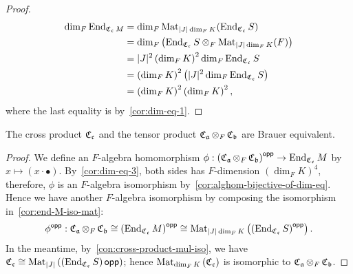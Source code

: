 \begin{proof}
  \[
    \begin{aligned}
      \dim_{F}\End_{\cross_{\mfc}M}
      &= \dim_{F}\mat_{|J|\dim_{F}K}(\End_{\cross_{\mfc}}S) \\
      &= \dim_{F}\left(\End_{\cross_{\mfc}}S\ox_{F}\mat_{|J|\dim_{F}K}(F)\right)\\
      &= |J|^{2}\left(\dim_{F}K\right)^{2}\dim_{F}\End_{\cross_{\mfc}}S\\
      &= \left(\dim_{F}K\right)^{2}\left(|J|^{2}\dim_{F}\End_{\cross_{\mfc}}S\right) \\
      &= \left(\dim_{F}K\right)^{2}\left(\dim_{F}K\right)^{2},
    \end{aligned}
  \]
  where the last equality is by~\cref{cor:dim-eq-1}.
\end{proof}

\begin{theorem}\label{thm:cross-mul}
  The cross product $\cross_{\mfc}$ and the tensor product $\cross_{\mfa}\ox_{F}\cross_{\mfb}$ are Brauer equivalent.
  \leanok
\end{theorem}

\begin{proof}
  We define an $F$-algebra homomorphism $\phi : \left(\cross_{\mfa}\ox_{F}\cross_{\mfb}\right)^{\opp} \to \End_{\cross_{\mfc}}M$ by
  $x \mapsto (x \cdot \bullet)$. By~\cref{cor:dim-eq-3}, both sides has $F$-dimension $\left(\dim_{F}K\right)^{4}$, therefore, $\phi$ is an $F$-algebra isomorphism by~\cref{cor:alghom-bijective-of-dim-eq}. Hence we have another $F$-algebra isomorphism by composing the isomorphism in~\cref{cor:end-M-iso-mat}:
  \[
    \phi^{\opp}:\cross_{\mfa}\ox_{F}\cross_{\mfb}\cong \left(\End_{\cross_{\mfc}}M\right)^{\opp}\cong \mat_{|J|\dim_{F}K}\left(\left(\End_{\cross_{\mfc}}S\right)^{\opp}\right).
  \]
  In the meantime, by~\cref{con:cross-product-mul-iso}, we have $\cross_{\mfc}\cong\mat_{|J|}\left(\left(\End_{\cross_{\mfc}}S\right)\opp\right)$; hence $\mat_{\dim_{F}K}\left(\cross_{\mfc}\right)$ is isomorphic to $\cross_{\mfa}\ox_{F}\cross_{\mfb}$.
\end{proof}

